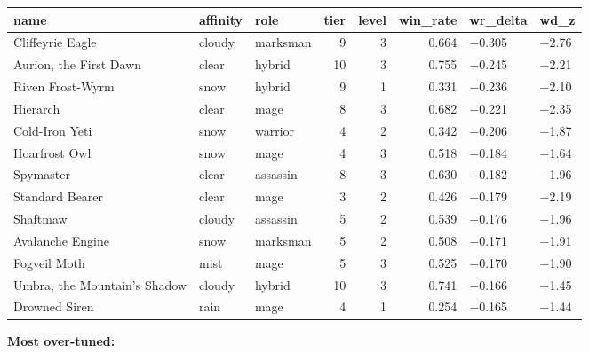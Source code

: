 \documentclass[10pt]{article}
\begin{document}
\medskip
\begin{tabularx}{\linewidth}{LLLrrrLL}
\toprule
\textbf{name} & \textbf{affinity} & \textbf{role} & \textbf{tier} & \textbf{level} & \textbf{win\_rate} & \textbf{wr\_delta} & \textbf{wd\_z} \\
\midrule
Cliffeyrie Eagle & cloudy & marksman & 9 & 3 & 0.664 & −0.305 & −2.76 \\
Aurion, the First Dawn & clear & hybrid & 10 & 3 & 0.755 & −0.245 & −2.21 \\
Riven Frost-Wyrm & snow & hybrid & 9 & 1 & 0.331 & −0.236 & −2.10 \\
Hierarch & clear & mage & 8 & 3 & 0.682 & −0.221 & −2.35 \\
Cold-Iron Yeti & snow & warrior & 4 & 2 & 0.342 & −0.206 & −1.87 \\
Hoarfrost Owl & snow & mage & 4 & 3 & 0.518 & −0.184 & −1.64 \\
Spymaster & clear & assassin & 8 & 3 & 0.630 & −0.182 & −1.96 \\
Standard Bearer & clear & mage & 3 & 2 & 0.426 & −0.179 & −2.19 \\
Shaftmaw & cloudy & assassin & 5 & 2 & 0.539 & −0.176 & −1.96 \\
Avalanche Engine & snow & marksman & 5 & 2 & 0.508 & −0.171 & −1.91 \\
Fogveil Moth & mist & mage & 5 & 3 & 0.525 & −0.170 & −1.90 \\
Umbra, the Mountain's Shadow & cloudy & hybrid & 10 & 3 & 0.741 & −0.166 & −1.45 \\
Drowned Siren & rain & mage & 4 & 1 & 0.254 & −0.165 & −1.44 \\
\bottomrule
\end{tabularx}
\medskip

\textbf{Most over-tuned:}\\
\end{document}
